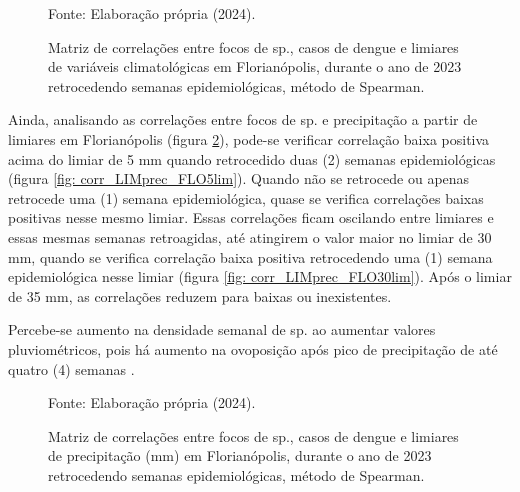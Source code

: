 \begin{figure}[htbp]
    \begin{center}
    \caption{Matriz de correlações entre focos de  sp., casos de dengue e limiares de variáveis climatológicas em Florianópolis, durante o ano de 2023 retrocedendo semanas epidemiológicas, método de Spearman.}
    \label{fig: matriz_corr_LIM_FLOretro}
        \hfill
    \end{center}
    \small{Fonte: Elaboração própria (2024).}
\end{figure}

Ainda, analisando as correlações entre focos de  sp. e precipitação a partir de limiares em Florianópolis (figura \ref{fig: matriz_corr_LIMprec_FLO}), pode-se verificar correlação baixa positiva acima do limiar de 5 mm quando retrocedido duas (2) semanas epidemiológicas (figura \ref{fig: corr_LIMprec_FLO5lim}). Quando não se retrocede ou apenas retrocede uma (1) semana epidemiológica, quase se verifica correlações baixas positivas nesse mesmo limiar. Essas correlações ficam oscilando entre limiares e essas mesmas semanas retroagidas, até atingirem o valor maior no limiar de 30 mm, quando se verifica correlação baixa positiva retrocedendo uma (1) semana epidemiológica nesse limiar (figura \ref{fig: corr_LIMprec_FLO30lim}). Após o limiar de 35 mm, as correlações reduzem para baixas ou inexistentes.

\indent Percebe-se aumento na densidade semanal de  sp. ao aumentar valores pluviométricos, pois há aumento na ovoposição após pico de precipitação de até quatro (4) semanas \cite{Valle2015Dengue}.

\begin{figure}[htbp]
    \begin{center}
    \caption{Matriz de correlações entre focos de  sp., casos de dengue e limiares de precipitação (mm) em Florianópolis, durante o ano de 2023 retrocedendo semanas epidemiológicas, método de Spearman.}
    \label{fig: matriz_corr_LIMprec_FLO}
        \hfill
    \end{center}
    \small{Fonte: Elaboração própria (2024).}
\end{figure}

